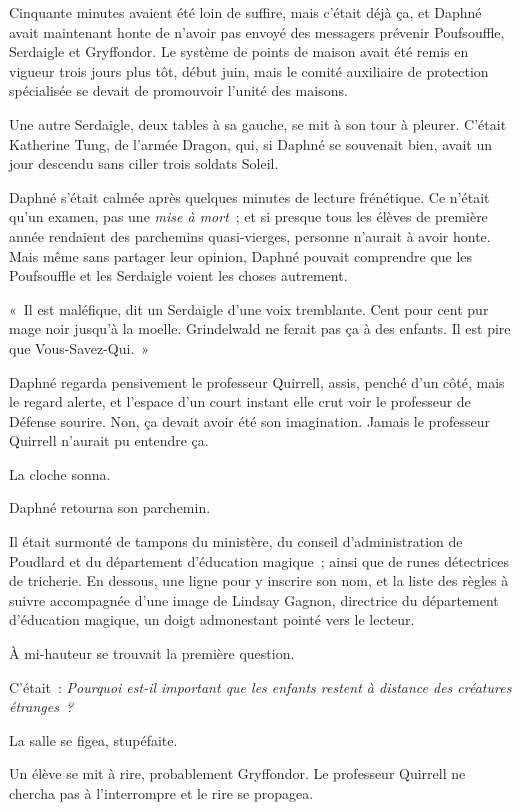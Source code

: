 Cinquante minutes avaient été loin de suffire, mais c'était déjà ça, et Daphné avait maintenant honte de n'avoir pas envoyé des messagers prévenir Poufsouffle, Serdaigle et Gryffondor. Le système de points de maison avait été remis en vigueur trois jours plus tôt, début juin, mais le comité auxiliaire de protection spécialisée se devait de promouvoir l'unité des maisons.

Une autre Serdaigle, deux tables à sa gauche, se mit à son tour à pleurer. C'était Katherine Tung, de l'armée Dragon, qui, si Daphné se souvenait bien, avait un jour descendu sans ciller trois soldats Soleil.

Daphné s'était calmée après quelques minutes de lecture frénétique. Ce n'était qu'un examen, pas une \emph{mise à mort}~; et si presque tous les élèves de première année rendaient des parchemins quasi-vierges, personne n'aurait à avoir honte. Mais même sans partager leur opinion, Daphné pouvait comprendre que les Poufsouffle et les Serdaigle voient les choses autrement.

«~Il est maléfique, dit un Serdaigle d'une voix tremblante. Cent pour cent pur mage noir jusqu'à la moelle. Grindelwald ne ferait pas ça à des enfants. Il est pire que Vous-Savez-Qui.~»

Daphné regarda pensivement le professeur Quirrell, assis, penché d'un côté, mais le regard alerte, et l'espace d'un court instant elle crut voir le professeur de Défense sourire. Non, ça devait avoir été son imagination. Jamais le professeur Quirrell n'aurait pu entendre ça.

La cloche sonna.

Daphné retourna son parchemin.

Il était surmonté de tampons du ministère, du conseil d'administration de Poudlard et du département d'éducation magique~; ainsi que de runes détectrices de tricherie. En dessous, une ligne pour y inscrire son nom, et la liste des règles à suivre accompagnée d'une image de Lindsay Gagnon, directrice du département d'éducation magique, un doigt admonestant pointé vers le lecteur.

À mi-hauteur se trouvait la première question.

C'était~: \emph{Pourquoi est-il important que les enfants restent à distance des créatures étranges~?}

La salle se figea, stupéfaite.

Un élève se mit à rire, probablement Gryffondor. Le professeur Quirrell ne chercha pas à l'interrompre et le rire se propagea.

